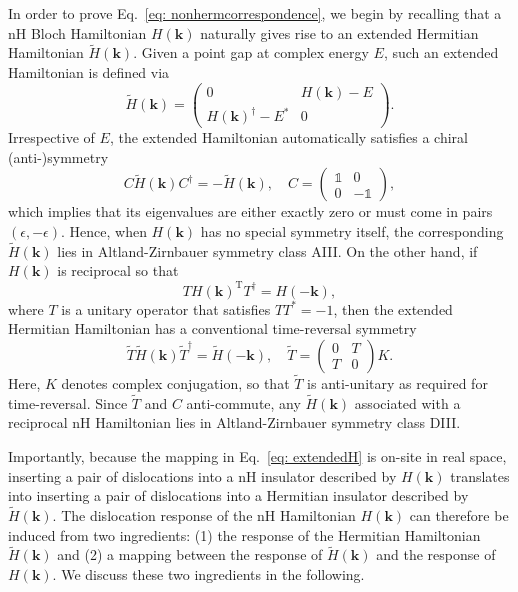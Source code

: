 \documentclass[prb,reprint,twocolumn,preprintnumbers,amsmath,amssymb,showpacs,nofootinbib,superscriptaddress]{revtex4-2}
\newcommand{\bs}[1]{\boldsymbol{#1}}
\begin{document}
In order to prove Eq.~\eqref{eq: nonhermcorrespondence}, we begin by recalling that a nH Bloch Hamiltonian $H(\bs{k})$ naturally gives rise to an extended Hermitian Hamiltonian $\tilde{H}(\bs{k})$. Given a point gap at complex energy $E$, such an extended Hamiltonian is defined via
\begin{equation} \label{eq: extendedH}
    \tilde{H}(\bs{k}) = \begin{pmatrix}
    0 & H(\bs{k})-E \\
    H(\bs{k})^\dagger -E^* & 0
    \end{pmatrix}.
\end{equation}
Irrespective of $E$, the extended Hamiltonian automatically satisfies a chiral (anti-)symmetry
\begin{equation} \label{eq: chiralsym}
C\tilde{H}(\bs{k}) C^\dagger = - \tilde{H}(\bs{k}), \quad C= \begin{pmatrix} \mathbb{1} & 0 \\ 0 & - \mathbb{1} \end{pmatrix},
\end{equation}
which implies that its eigenvalues are either exactly zero or must come in pairs $(\epsilon,-\epsilon)$. Hence, when $H(\bs{k})$ has no special symmetry itself, the corresponding $\tilde{H}(\bs{k})$ lies in Altland-Zirnbauer symmetry class AIII. On the other hand, if $H(\bs{k})$ is reciprocal so that
\begin{equation} \label{eq:reciprocity}
T H(\bs{k})^{\mathrm{T}} T^\dagger = H(-\bs{k}),
\end{equation}
where $T$ is a unitary operator that satisfies $T T^* = -1$, then the extended Hermitian Hamiltonian has a conventional time-reversal symmetry
\begin{equation}
\tilde{T}\tilde{H}(\bs{k}) \tilde{T}^\dagger = \tilde{H}(-\bs{k}), \quad \tilde{T} = \begin{pmatrix} 0 & T \\ T & 0 \end{pmatrix} \mathit{K}.
\end{equation}
Here, $\mathit{K}$ denotes complex conjugation, so that $\tilde{T}$ is anti-unitary as required for time-reversal. Since $\tilde{T}$ and $C$ anti-commute, any $\tilde{H}(\bs{k})$ associated with a reciprocal nH Hamiltonian lies in Altland-Zirnbauer symmetry class DIII.

Importantly, because the mapping in Eq.~\eqref{eq: extendedH} is on-site in real space, inserting a pair of dislocations into a nH insulator described by $H(\bs{k})$ translates into inserting a pair of dislocations into a Hermitian insulator described by $\tilde{H}(\bs{k})$. The dislocation response of the nH Hamiltonian $H(\bs{k})$ can therefore be induced from two ingredients: (1) the response of the Hermitian Hamiltonian $\tilde{H}(\bs{k})$ and (2) a mapping between the response of $\tilde{H}(\bs{k})$ and the response of $H(\bs{k})$. We discuss these two ingredients in the following.
\end{document}
